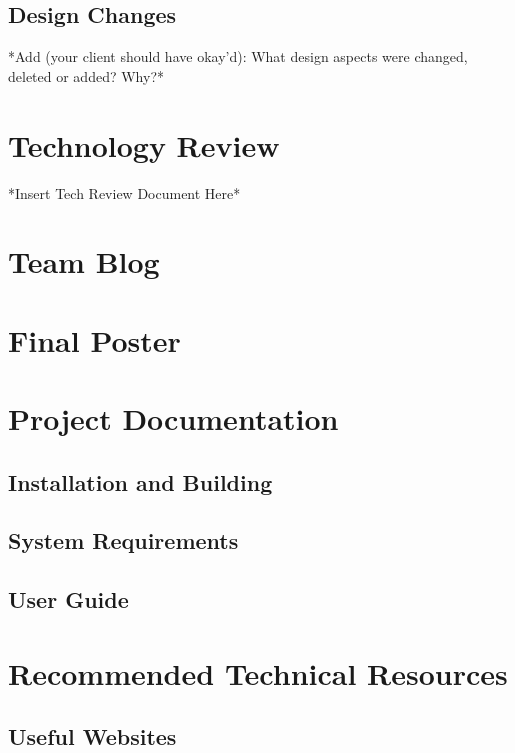 \documentclass[onecolumn, draftclsnofoot,10pt, compsoc]{IEEEtran}
\begin{document}
\subsection{Design Changes}
*Add (your client should have okay'd): What design aspects were changed, deleted or added? Why?*


\section{Technology Review}
*Insert Tech Review Document Here*
 
 

\section{Team Blog}

\section{Final Poster}
  
\section{Project Documentation}
\subsection{Installation and Building}

\subsection{System Requirements}

\subsection{User Guide}

\section{Recommended Technical Resources}
\subsection{Useful Websites}
\end{document}
